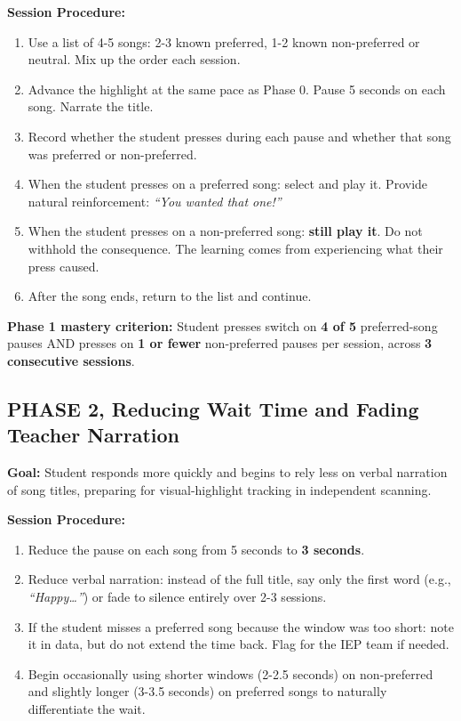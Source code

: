 \documentclass[justified,openright]{tufte-book}
\begin{document}
\textbf{Session Procedure:}

\begin{enumerate}
\item
  Use a list of 4-5 songs: 2-3 known preferred, 1-2 known
  non-preferred or neutral. Mix up the order each session.
\item
  Advance the highlight at the same pace as Phase 0. Pause 5 seconds on
  each song. Narrate the title.
\item
  Record whether the student presses during each pause and whether that
  song was preferred or non-preferred.
\item
  When the student presses on a preferred song: select and play it.
  Provide natural reinforcement: \emph{``You wanted that one!''}
\item
  When the student presses on a non-preferred song: \textbf{still play
  it}. Do not withhold the consequence. The learning comes from
  experiencing what their press caused.
\item
  After the song ends, return to the list and continue.
\end{enumerate}

\textbf{Phase 1 mastery criterion:} Student presses switch on \textbf{4
of 5} preferred-song pauses AND presses on \textbf{1 or fewer}
non-preferred pauses per session, across \textbf{3 consecutive
sessions}.

\subsection{PHASE 2, Reducing Wait Time and Fading Teacher
Narration}\label{phase-2-reducing-wait-time-and-fading-teacher-narration}

\textbf{Goal:} Student responds more quickly and begins to rely less on
verbal narration of song titles, preparing for visual-highlight
tracking in independent scanning.

\textbf{Session Procedure:}

\begin{enumerate}
\item
  Reduce the pause on each song from 5 seconds to \textbf{3 seconds}.
\item
  Reduce verbal narration: instead of the full title, say only the first
  word (e.g., \emph{``Happy\ldots{}''}) or fade to silence entirely over
  2-3 sessions.
\item
  If the student misses a preferred song because the window was too
  short: note it in data, but do not extend the time back. Flag for the
  IEP team if needed.
\item
  Begin occasionally using shorter windows (2-2.5 seconds) on
  non-preferred and slightly longer (3-3.5 seconds) on preferred songs
  to naturally differentiate the wait.
\end{enumerate}
\end{document}
